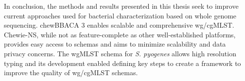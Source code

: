 In conclusion, the methods and results presented in this thesis seek to improve current approaches used for bacterial characterization based on whole genome sequencing. chewBBACA 3 enables scalable and comprehensive wg/cgMLST. Chewie-NS, while not as feature-complete as other well-established platforms, provides easy access to schemas and aims to minimize scalability and data privacy concerns. The wgMLST schema for \textit{S. pyogenes} allows high resolution typing and its development enabled defining key steps to create a framework to improve the quality of wg/cgMLST schemas.
